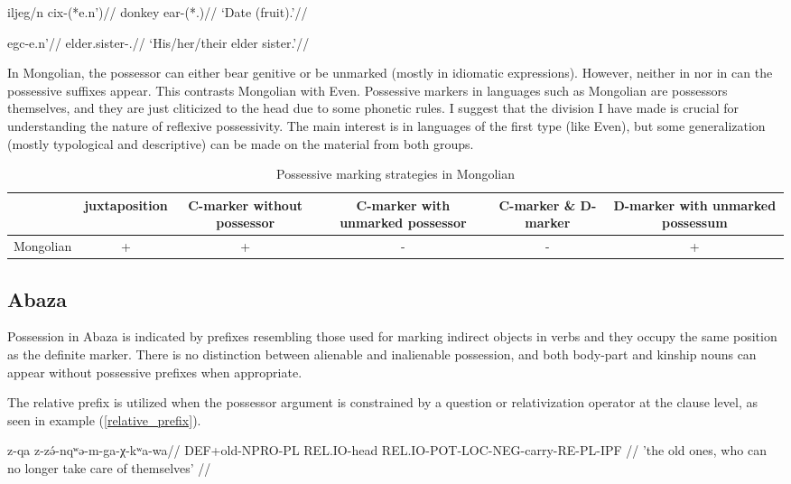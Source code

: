 \a
\label{mongolb}
\begingl
\gla iljeg/n cix-(*e.n')//
\glb donkey ear-(*\Poss{}.\Third{})//
\glft `Date (fruit).'//
\endgl

\a
\label{mongolc}
\begingl
\gla egc-e.n'//
\glb elder.sister-\Poss{}.\Third{}//
\glft `His/her/their elder sister.'//
\endgl
\xe

In Mongolian, the possessor can either bear genitive or be unmarked (mostly in idiomatic expressions). However, neither in  nor in  can the possessive suffixes appear. This contrasts Mongolian with Even. Possessive markers in languages such as Mongolian are possessors themselves, and they are just cliticized to the head due to some phonetic rules. I suggest that the division I have made is crucial for understanding the nature of reflexive possessivity. The main interest is in languages of the first type (like Even), but some generalization (mostly typological and descriptive) can be made on the material from both groups.

\begin{table}[h!]
	\centering
	\small
	\begin{tabular}{@{}cccccc@{}}
		\toprule
		& juxtaposition & \parbox{2.5cm}{C-marker without possessor} & \parbox{2.75cm}{C-marker with unmarked possessor} & \parbox{1.75cm}{C-marker \& D-marker} & \parbox{3cm}{D-marker with unmarked possessum} \\ \midrule
		Mongolian & + & + & - & - & + \\ \bottomrule
	\end{tabular}
	\caption{Possessive marking strategies in Mongolian}
\end{table}

\subsection{Abaza}

Possession in Abaza is indicated by prefixes resembling those used for marking indirect objects in verbs and they occupy the same position as the definite marker. There is no distinction between alienable and inalienable possession, and both body-part and kinship nouns can appear without possessive prefixes when appropriate.

The relative prefix is utilized when the possessor argument is constrained by a question or relativization operator at the clause level, as seen in example (\ref{relative_prefix}).

\ex
\label{relative_prefix}
\begingl
{} z-qa z-zə́-nqʷə-m-ga-χ-kʷa-wa//
\glb DEF+old-NPRO-PL REL.IO-head REL.IO-POT-LOC-NEG-carry-RE-PL-IPF //
\glft 'the old ones, who can no longer take care of themselves' //
\endgl
\xe

